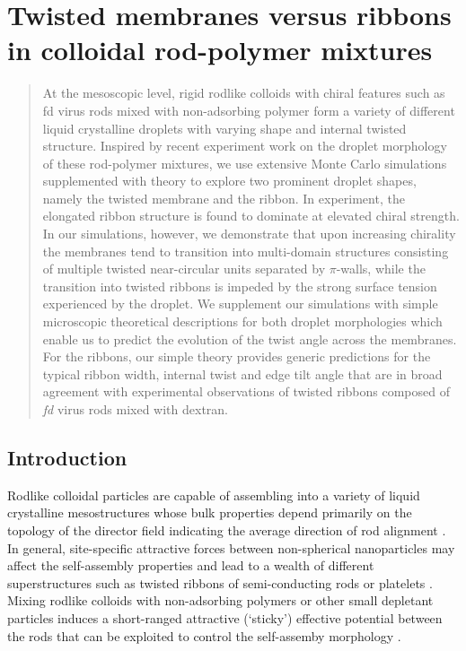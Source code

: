 
\chapter{ Twisted membranes versus ribbons in colloidal rod-polymer mixtures}
\label{twistedrods}



\begin{abstract}

At the mesoscopic level, rigid rodlike colloids with chiral features such as {\rm fd} virus rods mixed with non-adsorbing polymer form a variety of different liquid crystalline droplets with varying shape and internal twisted structure. Inspired by recent experiment work on the droplet morphology of these rod-polymer mixtures, we use extensive Monte Carlo simulations supplemented with theory to explore two prominent droplet shapes, namely the twisted membrane and the ribbon. In experiment, the elongated ribbon structure is found to dominate at elevated chiral strength. In our simulations, however, we demonstrate that upon increasing chirality the membranes tend to transition into multi-domain structures consisting of multiple twisted near-circular units separated by $\pi$-walls, while the transition into twisted ribbons is impeded by the strong surface tension experienced by the droplet. We supplement our simulations with simple microscopic theoretical descriptions for both droplet morphologies which enable us to predict the evolution of the twist angle across the membranes. For the ribbons, our simple theory provides generic predictions for the typical ribbon width, internal twist and edge tilt angle that are in broad agreement with experimental observations of twisted ribbons composed of  {\em fd}
virus rods mixed with dextran. 

\end{abstract}



\section{Introduction}




Rodlike colloidal particles are capable of assembling into a variety of liquid crystalline mesostructures whose bulk properties depend primarily on the topology of the director field indicating the average direction of rod alignment \cite{dogic-fraden_fil,Ikkala2407}.
In general,  site-specific attractive forces between non-spherical nanoparticles may affect the self-assembly properties  and lead to a wealth of different superstructures \cite{Wang358} such as twisted ribbons of semi-conducting rods \cite{Srivastava1355} or platelets \cite{Janae1701483}.
Mixing rodlike colloids with non-adsorbing polymers or other small depletant particles induces a short-ranged attractive  (`sticky') effective potential between the rods that can be exploited to control the self-assemby morphology \cite{Baranov2010,Sharma2014}. 
 


